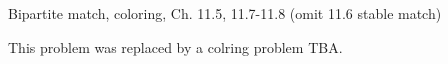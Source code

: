 \documentclass[handout]{mcs}
\begin{document}

\begin{staffnotes}
Bipartite match, coloring, Ch. 11.5, 11.7-11.8 (omit 11.6 stable match)
\end{staffnotes}


\begin{problem}
This problem was replaced by a colring problem TBA.
\end{problem}




\end{document}
